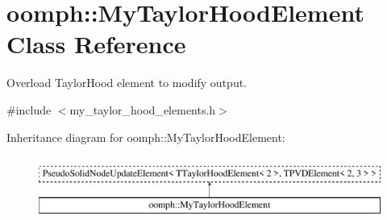 \hypertarget{classoomph_1_1MyTaylorHoodElement}{}\section{oomph\+:\+:My\+Taylor\+Hood\+Element Class Reference}
\label{classoomph_1_1MyTaylorHoodElement}


Overload Taylor\+Hood element to modify output.  




{\ttfamily \#include $<$my\+\_\+taylor\+\_\+hood\+\_\+elements.\+h$>$}

Inheritance diagram for oomph\+:\+:My\+Taylor\+Hood\+Element\+:\begin{figure}[H]
\begin{center}
\leavevmode
\includegraphics[height=2.000000cm]{classoomph_1_1MyTaylorHoodElement}
\end{center}
\end{figure}
